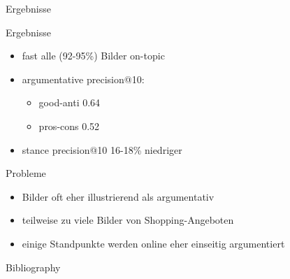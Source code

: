 \documentclass{beamer}
\begin{document}
	\begin{section}{Ergebnisse}
		\begin{frame}{Ergebnisse}
			\begin{itemize}
				\item fast alle (92-95\%) Bilder on-topic
				\item argumentative precision@10: \begin{itemize}
					\item good-anti 0.64
					\item pros-cons 0.52
				\end{itemize}
				\item stance precision@10 16-18\% niedriger
			\end{itemize}
		\end{frame}
	
	\begin{frame}{Probleme}
		\begin{itemize}
			\item Bilder oft eher illustrierend als argumentativ
			\item teilweise zu viele Bilder von Shopping-Angeboten
			\item einige Standpunkte werden online eher einseitig argumentiert
		\end{itemize}
	\end{frame}
	\end{section}
	
	\begin{frame}[allowframebreaks]{Bibliography}
		\printbibliography
	\end{frame}
	
\end{document}
